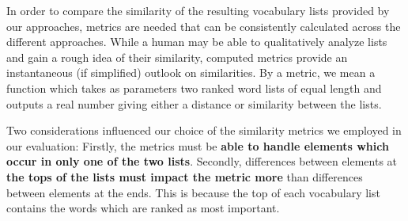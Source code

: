 In order to compare the similarity of the resulting vocabulary lists provided by our approaches, metrics are needed that can be consistently calculated across the different approaches.
While a human may be able to qualitatively analyze lists and gain a rough idea of their similarity, computed metrics provide an instantaneous (if simplified) outlook on similarities.
By a metric, we mean a function which takes as parameters two ranked word lists of equal length and outputs a real number giving either a distance or similarity between the lists.

Two considerations influenced our choice of the similarity metrics we employed in our evaluation:
Firstly, the metrics must be \textbf{able to handle elements which occur in only one of the two lists}.
Secondly, differences between elements at \textbf{the tops of the lists must impact the metric more} than differences between elements at the ends.
This is because the top of each vocabulary list contains the words which are ranked as most important.

